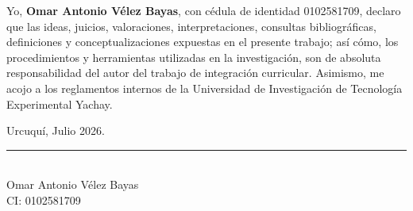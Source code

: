 
Yo, \textbf{Omar Antonio Vélez Bayas}, con cédula de identidad 0102581709, declaro que las ideas, juicios, valoraciones, interpretaciones, consultas bibliográficas, definiciones y conceptualizaciones expuestas en el presente trabajo; así cómo, los procedimientos y herramientas utilizadas en la investigación, son de absoluta responsabilidad del autor del trabajo de integración curricular. Asimismo, me acojo a los reglamentos internos de la Universidad de Investigación de Tecnología Experimental Yachay.

\vspace{0.6cm}

\noindent Urcuquí, Julio 2026.

\vspace{2.5cm}

\begin{center}
    \rule[0mm]{70mm}{0.1mm} \\
    {Omar Antonio Vélez Bayas}\\
    CI: 0102581709
\end{center}

\thispagestyle{empty} %
